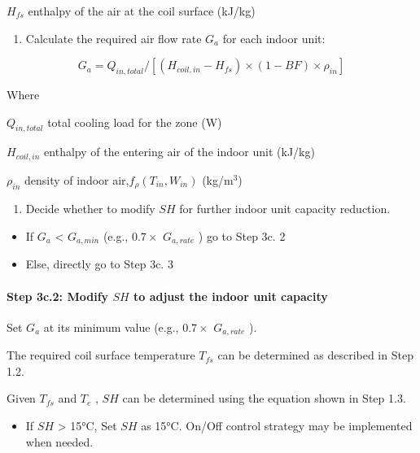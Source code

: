 \(H_{fs}\) enthalpy of the air at the coil surface (kJ/kg)

\begin{enumerate}
\def\labelenumi{\arabic{enumi})}
\setcounter{enumi}{2}
\tightlist
\item
  Calculate the required air flow rate \(G_a\) for each indoor unit:
\end{enumerate}

\begin{equation}
G_a = Q_{in,total}/[(H_{coil,in}-H_{fs})\times{(1-BF)}\times{\rho_{in}}]
\end{equation}

Where

\(Q_{in,total}\) total cooling load for the zone (W)

\(H_{coil,in}\) enthalpy of the entering air of the indoor unit (kJ/kg)

\(\rho_{in}\) density of indoor air,\(f_{\rho}(T_{in},W_{in})\) (kg/m\(^{3}\))

\begin{enumerate}
\def\labelenumi{\arabic{enumi})}
\setcounter{enumi}{3}
\tightlist
\item
  Decide whether to modify \(SH\) for further indoor unit capacity reduction.
\end{enumerate}

\begin{itemize}
\item
  If \(G_a\) \textless{} \(G_{a,min}\) (e.g., \(0.7\times\) \(G_{a,rate}\) ) go to Step 3c. 2
\item
  Else, directly go to Step 3c. 3
\end{itemize}

\paragraph{\texorpdfstring{Step 3c.2: Modify \(SH\) to adjust the indoor unit capacity}{Step 3c.2: Modify SH to adjust the indoor unit capacity}}\label{step-3c.2-modify-sh-to-adjust-the-indoor-unit-capacity}

Set \(G_a\) at its minimum value (e.g., \(0.7\times\) \(G_{a,rate}\) ).

The required coil surface temperature \(T_{fs}\) can be determined as described in Step 1.2.

Given \(T_{fs}\) and \(T_e\) , \(SH\) can be determined using the equation shown in Step 1.3.

\begin{itemize}
\tightlist
\item
  If \(SH\) \textgreater{} 15°C, Set \(SH\) as 15°C. On/Off control strategy may be implemented when needed.
\end{itemize}

